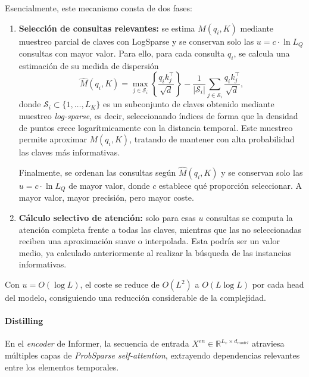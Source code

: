 Esencialmente, este mecanismo consta de dos fases:
\begin{enumerate}
    \item \textbf{Selección de consultas relevantes:} se estima \(M(q_i,K)\) mediante muestreo parcial de claves con LogSparse y se conservan solo las \(u = c \cdot \ln L_Q\) consultas con mayor valor.
    Para ello, para cada consulta \(q_i\), se calcula una estimación de su medida de dispersión
    \begin{equation}
        \hat{M}(q_i, K) = \max_{j \in \mathcal{S}_i} \left\{ \frac{q_i k_j^\top}{\sqrt{d}} \right\} - \frac{1}{|\mathcal{S}_i|} \sum_{j \in \mathcal{S}_i} \frac{q_i k_j^\top}{\sqrt{d}},
    \end{equation}
    donde \(\mathcal{S}_i \subset \{1, \dots, L_K\}\) es un subconjunto de claves obtenido mediante muestreo \textit{log-sparse}, es decir, seleccionando índices de forma que la densidad de puntos crece logarítmicamente con la distancia temporal.
    Este muestreo permite aproximar \(M(q_i, K)\), tratando de mantener con alta probabilidad las claves más informativas.

    Finalmente, se ordenan las consultas según \(\hat{M}(q_i, K)\) y se conservan solo las \(u = c \cdot \ln L_Q\) de mayor valor, donde \(c\) establece qué proporción seleccionar. A mayor valor, mayor precisión, pero mayor coste.

    \item \textbf{Cálculo selectivo de atención:} solo para esas \(u\) consultas se computa la atención completa frente a todas las claves, mientras que las no seleccionadas reciben una aproximación suave o interpolada. Esta podría ser un valor medio, ya calculado anteriormente al realizar la búsqueda de las instancias informativas.
\end{enumerate}

Con \(u = O(\log L)\), el coste se reduce de \(O(L^2)\) a \(O(L \log L)\) por cada head del modelo, consiguiendo una reducción considerable de la complejidad.

\paragraph{Distilling}

En el \textit{encoder} de Informer, la secuencia de entrada \(X^{en} \in \mathbb{R}^{L_x \times d_{model}}\) atraviesa múltiples capas de \textit{ProbSparse self-attention}, extrayendo dependencias relevantes entre los elementos temporales.\\

